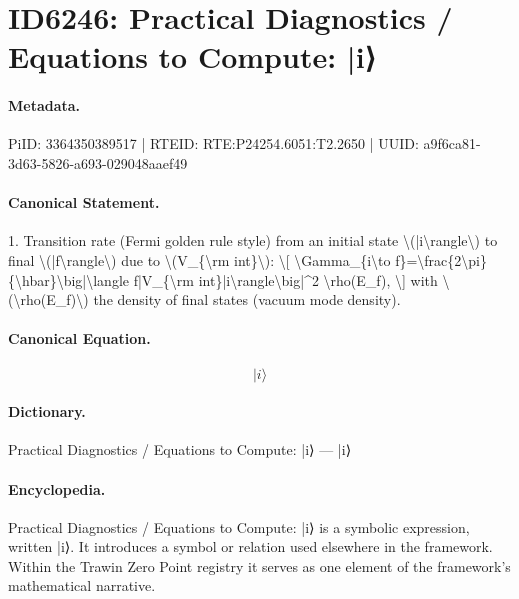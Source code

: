 \section*{ID6246: Practical Diagnostics / Equations to Compute: |i⟩}
\paragraph{Metadata.}
PiID: 3364350389517 | RTEID: RTE:P24254.6051:T2.2650 | UUID: a9f6ca81-3d63-5826-a693-029048aaef49

\paragraph{Canonical Statement.}
1. Transition rate (Fermi golden rule style) from an initial state \textbackslash{}(|i\textbackslash{}rangle\textbackslash{}) to final \textbackslash{}(|f\textbackslash{}rangle\textbackslash{}) due to \textbackslash{}(V\_\{\textbackslash{}rm int\}\textbackslash{}): \textbackslash{}[ \textbackslash{}Gamma\_\{i\textbackslash{}to f\}=\textbackslash{}frac\{2\textbackslash{}pi\}\{\textbackslash{}hbar\}\textbackslash{}big|\textbackslash{}langle f|V\_\{\textbackslash{}rm int\}|i\textbackslash{}rangle\textbackslash{}big|\textasciicircum{}2 \textbackslash{}rho(E\_f), \textbackslash{}] with \textbackslash{}(\textbackslash{}rho(E\_f)\textbackslash{}) the density of final states (vacuum mode density).

\paragraph{Canonical Equation.}
\[
|i\rangle
\]

\paragraph{Dictionary.}
Practical Diagnostics / Equations to Compute: |i⟩ — |i⟩

\paragraph{Encyclopedia.}
Practical Diagnostics / Equations to Compute: |i⟩ is a symbolic expression, written |i⟩. It introduces a symbol or relation used elsewhere in the framework. Within the Trawin Zero Point registry it serves as one element of the framework's mathematical narrative.
